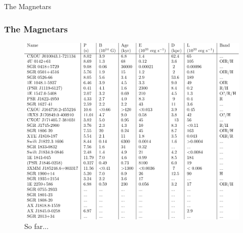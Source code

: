 \documentclass[hyperref=pdftex, presentation]{beamer}
\begin{document}
\begin{frame}{\Large The Magnetars}
\frametitle{\Large The Magnetars}

\begin{figure}
	\includegraphics[scale=.5]{tables/magnetar_table.pdf}
	\caption{So far...}
\end{figure}

\end{frame}


\end{document}
